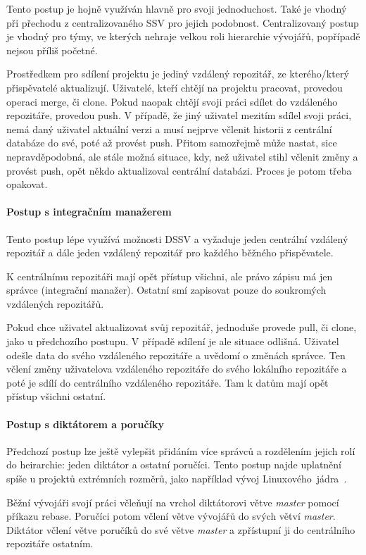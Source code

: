 \documentclass[
  biblatex,
  glossaries,
  index
]{kidiplom}
\begin{document}
Tento postup je hojně využíván hlavně pro svoji jednoduchost. Také je vhodný při přechodu z centralizovaného SSV pro jejich podobnost. Centralizovaný postup je vhodný pro týmy, ve kterých nehraje velkou roli hierarchie vývojářů, popřípadě nejsou příliš početné.

Prostředkem pro sdílení projektu je jediný vzdálený repozitář, ze kterého/který přispěvatelé aktualizují. Uživatelé, kteří chtějí na projektu pracovat, provedou operaci merge, či clone. Pokud naopak chtějí svoji práci sdílet do vzdáleného repozitáře, provedou push. V případě, že jiný uživatel mezitím sdílel svoji práci, nemá daný uživatel aktuální verzi a musí nejprve včlenit historii z centrální databáze do své, poté až provést push. Přitom samozřejmě může nastat, sice nepravděpodobná, ale stále možná situace, kdy, než uživatel stihl včlenit změny a provést push, opět někdo aktualizoval centrální databázi. Proces je potom třeba opakovat.

\paragraph*{Postup s integračním manažerem}
Tento postup lépe využívá možnosti DSSV a vyžaduje jeden centrální vzdálený repozitář a dále jeden vzdálený repozitář pro každého běžného přispěvatele.

K centrálnímu repozitáři mají opět přístup všichni, ale právo zápisu má jen správce (integrační manažer). Ostatní smí zapisovat pouze do soukromých vzdálených repozitářů.

Pokud chce uživatel aktualizovat svůj repozitář, jednoduše provede pull, či clone, jako u předchozího postupu. V případě sdílení je ale situace odlišná. Uživatel odešle data do svého vzdáleného repozitáře a uvědomí o změnách správce. Ten včlení změny uživatelova vzdáleného repozitáře do svého lokálního repozitáře a poté je sdílí do centrálního vzdáleného repozitáře. Tam k datům mají opět přístup všichni ostatní.

\paragraph*{Postup s diktátorem a poručíky}
Předchozí postup lze ještě vylepšit přidáním více správců a rozdělením jejich rolí do heirarchie: jeden diktátor a ostatní poručíci. Tento postup najde uplatnění spíše u projektů extrémních rozměrů, jako například vývoj Linuxového~jádra~\cite{linux}.

Běžní vývojáři svojí práci včleňují na vrchol diktátorovi větve {\it master} pomocí příkazu rebase. Poručíci potom včlení větve vývojářů do svých větví {\it master}. Diktátor včlení větve poručíků do své větve {\it master} a zpřístupní ji do centrálního repozitáře ostatním.
\end{document}
